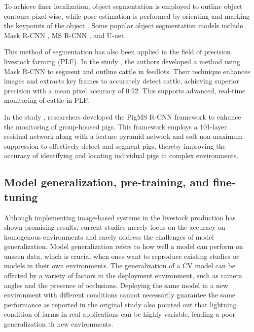 To achieve finer localization, object segmentation is employed to outline object contours pixel-wise, while pose estimation is performed by orienting and marking the keypoints of the object \cite{hariharan2015hypercolumns}. Some popular object segmentation models include Mask R-CNN \cite{he2017mask}, MS R-CNN \cite{huang2019mask}, and U-net \cite{siddique2021u}.

This method of segmentation has also been applied in the field of precision livestock farming (PLF). In the study \cite{noe2022automatic}, the authors developed a method using Mask R-CNN \cite{he2017mask} to segment and outline cattle in feedlots. Their technique enhances images and extracts key frames to accurately detect cattle, achieving superior precision with a mean pixel accuracy of 0.92. This supports advanced, real-time monitoring of cattle in PLF.

In the study \cite{tu2021automatic}, researchers developed the PigMS R-CNN framework \cite{huang2019mask} to enhance the monitoring of group-housed pigs. This framework employs a 101-layer residual network along with a feature pyramid network and soft non-maximum suppression to effectively detect and segment pigs, thereby improving the accuracy of identifying and locating individual pigs in complex environments.







\subsection*{Model generalization, pre-training, and fine-tuning}

Although implementing image-based systems in the livestock production has shown promising results, current studies merely focus on the accuracy on homogenous environments and rarely address the challenges of model generalization. Model generalization refers to how well a model can perform on unseen data, which is crucial when ones want to reproduce existing studies or models in their own environments. The generalization of a CV model can be affected by a variety of factors in the deployment environment, such as camera angles and the presence of occlusions. Deploying the same model in a new environment with different conditions cannot necessarily guarantee the same performance as reported in the original study \cite{li2021practices} also pointed out that lightning condition of farms in real applications can be highly variable, leading a poor generalization th new environments.

